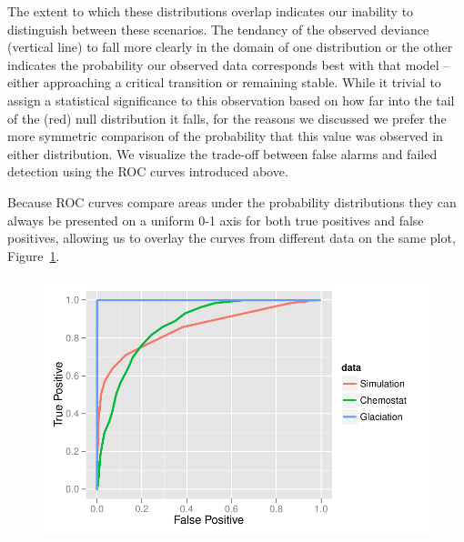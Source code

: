 \documentclass[authoryear,review,11pt]{elsarticle}
\begin{document}
The extent to which these distributions overlap indicates our inability to distinguish between these scenarios.  
The tendancy of the observed deviance (vertical line) to fall more clearly in the domain of one distribution or the other 
indicates the probability our observed data corresponds best with that model  -- 
either approaching a critical transition or remaining stable.  
While it trivial to assign a statistical significance to this observation based 
on how far into the tail of the (red) null distribution it falls, 
for the reasons we discussed we prefer the more symmetric comparison of the probability that 
this value was observed in either distribution.  
We visualize the trade-off between false alarms and failed detection using the ROC curves introduced above.  

Because ROC curves compare areas under the probability distributions they can always be presented on a uniform 0-1 axis
for both true positives and false positives, allowing us to overlay the curves from different data on the same plot,
Figure~\ref{fig:rocdata}.

 \begin{figure}
   \begin{center}
     \includegraphics[width=\linewidth]{figures/rocplot.pdf}
     \caption{ }
     \label{fig:rocdata}
  \end{center}
 \end{figure}


\end{document}
